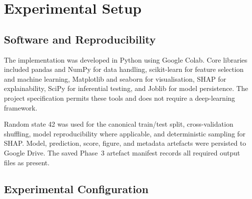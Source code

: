 \documentclass[11pt,a4paper]{article}
\begin{document}
\section{Experimental Setup}

\subsection{Software and Reproducibility}

The implementation was developed in Python using Google Colab.
Core libraries included pandas \cite{mckinney2010} and NumPy
\cite{harris2020} for data handling, scikit-learn \cite{pedregosa2011}
for feature selection and machine learning, Matplotlib
\cite{hunter2007} and seaborn \cite{waskom2021} for visualisation,
SHAP \cite{lundberg2017} for explainability, SciPy
\cite{virtanen2020} for inferential testing, and Joblib
\cite{joblibdocs} for model persistence. The project specification
permits these tools and does not require a deep-learning framework.

Random state 42 was used for the canonical train/test split, cross-validation shuffling, model reproducibility where applicable, and deterministic sampling for SHAP. Model, prediction, score, figure, and metadata artefacts were persisted to Google Drive. The saved Phase~3 artefact manifest records all required output files as present.

\subsection{Experimental Configuration}
\end{document}
